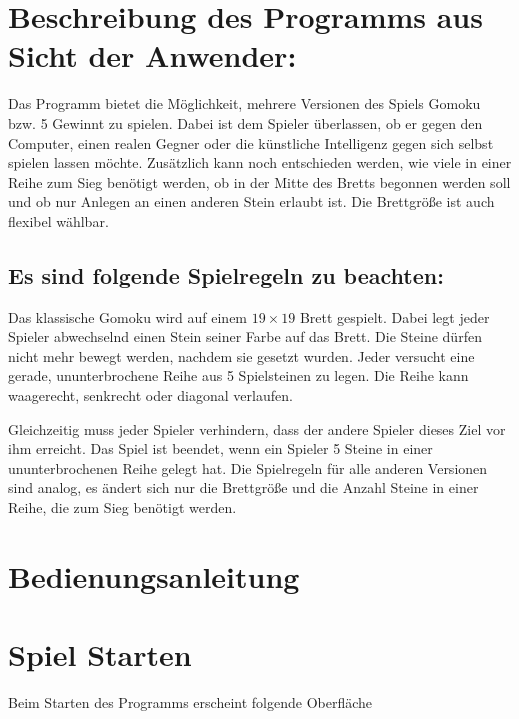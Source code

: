 \documentclass[11pt]{article}
\newcommand{\1}{{\mathds{1}}}
\begin{document}
	\pagestyle{fancy}
	
	\section*{Beschreibung des Programms aus Sicht der Anwender:}
	
	Das Programm bietet die Möglichkeit, mehrere Versionen des Spiels Gomoku bzw. 5 Gewinnt zu spielen.
	Dabei ist dem Spieler überlassen, ob er gegen den Computer, einen realen Gegner oder die künstliche Intelligenz gegen sich selbst spielen lassen möchte.
	Zusätzlich kann noch entschieden werden, wie viele in einer Reihe zum Sieg benötigt werden, 
	ob in der Mitte des Bretts begonnen werden soll und ob nur Anlegen an einen anderen Stein erlaubt ist.
	Die Brettgröße ist auch flexibel wählbar.
	
	\subsection*{Es sind folgende Spielregeln zu beachten:}
	Das klassische Gomoku wird auf einem $19 \times 19$ Brett gespielt.
	Dabei legt jeder Spieler abwechselnd einen Stein seiner Farbe auf das Brett.
	Die Steine dürfen nicht mehr bewegt werden, nachdem sie gesetzt wurden. Jeder versucht eine gerade, ununterbrochene Reihe aus 5 Spielsteinen zu legen.
	Die Reihe kann waagerecht, senkrecht oder diagonal verlaufen. 
	
	Gleichzeitig muss jeder Spieler verhindern, dass der andere Spieler dieses Ziel vor ihm erreicht.
	Das Spiel ist beendet, wenn ein Spieler 5 Steine in einer ununterbrochenen Reihe gelegt hat. 
	Die Spielregeln für alle anderen Versionen sind analog, es ändert sich nur die Brettgröße und die Anzahl Steine in einer Reihe, die zum Sieg benötigt werden. 
	
	
	\section*{Bedienungsanleitung}
	
	\section{Spiel Starten}
	Beim Starten des Programms erscheint folgende Oberfläche
	
\end{document}
